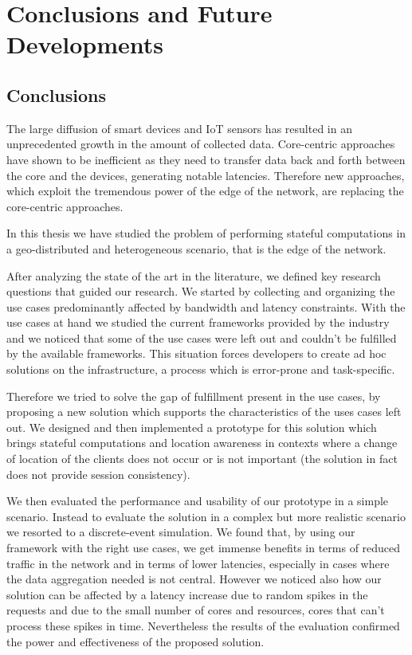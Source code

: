 \chapter{Conclusions and Future Developments}
\label{ch:conclusions}


\section{Conclusions}
The large diffusion of smart devices and IoT sensors has resulted in an unprecedented growth in the amount of collected data. Core-centric approaches have shown to be inefficient as they need to transfer data back and forth between the core and the devices, generating notable latencies. Therefore new approaches, which exploit the tremendous power of the edge of the network, are replacing the core-centric approaches.

In this thesis we have studied the problem of performing stateful computations in a geo-distributed and heterogeneous scenario, that is the edge of the network.

After analyzing the state of the art in the literature, we defined key research questions that guided our research.
We started by collecting and organizing the use cases predominantly affected by bandwidth and latency constraints. With the use cases at hand we studied the current frameworks provided by the industry and we noticed that some of the use cases were left out and couldn't be fulfilled by the available frameworks. This situation forces developers to create ad hoc solutions on the infrastructure, a process which is error-prone and task-specific.

Therefore we tried to solve the gap of fulfillment present in the use cases, by proposing a new solution which supports the characteristics of the uses cases left out. We designed and then implemented a prototype for this solution which brings stateful computations and location awareness in contexts where a change of location of the clients does not occur or is not important (the solution in fact does not provide session consistency).

We then evaluated the performance and usability of our prototype in a simple scenario. Instead to evaluate the solution in a complex but more realistic scenario we resorted to a discrete-event simulation.
We found that, by using our framework with the right use cases, we get immense benefits in terms of reduced traffic in the network and in terms of lower latencies, especially in cases where the data aggregation needed is not central. However we noticed also how our solution can be affected by a latency increase due to random spikes in the requests and due to the small number of cores and resources, cores that can't process these spikes in time. Nevertheless the results of the evaluation confirmed the power and effectiveness of the proposed solution.


